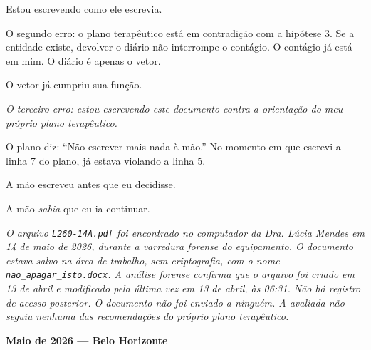 \noindent Estou escrevendo como ele escrevia.

\noindent O segundo erro: o plano terapêutico está em contradição com a
\noindent hipótese 3. Se a entidade existe, devolver o diário não interrompe
\noindent o contágio. O contágio já está em mim. O diário é apenas o vetor.

\noindent O vetor já cumpriu sua função.

\noindent \textit{O terceiro erro: estou escrevendo este documento contra a orientação do meu próprio plano terapêutico.}

\noindent O plano diz: ``Não escrever mais nada à mão.'' No momento em que escrevi a linha 7 do plano, já estava violando a linha 5.

\noindent A mão escreveu antes que eu decidisse.

\noindent A mão \textit{sabia} que eu ia continuar.

\noindent \textit{O arquivo \texttt{L260-14A.pdf} foi encontrado no computador da Dra. Lúcia
\noindent Mendes em 14 de maio de 2026, durante a varredura forense do equipamento. O
\noindent documento estava salvo na área de trabalho, sem criptografia, com o nome
\texttt{nao\_apagar\_isto.docx}. A análise forense confirma que o arquivo foi criado
\noindent em 13 de abril e modificado pela última vez em 13 de abril, às 06:31. Não há
\noindent registro de acesso posterior. O documento não foi enviado a ninguém. A avaliada
\noindent não seguiu nenhuma das recomendações do próprio plano terapêutico.}

\noindent \textbf{Maio de 2026 --- Belo Horizonte}

